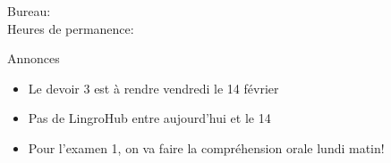 \documentclass{beamer}
\subtitle[Articles et quantités]{Les articles (suite) et les adverbes de quantité}
\begin{document}
  \begin{frame}
    \titlepage
    \tiny{Bureau: \\
          Heures de permanence: }
  \end{frame}

  \begin{frame}{Annonces}
    \begin{itemize}
      \item Le devoir 3 est à rendre vendredi le 14 février
      \item Pas de LingroHub entre aujourd'hui et le 14
      \item Pour l'examen 1, on va faire la compréhension orale lundi matin!
    \end{itemize}
  \end{frame}

\end{document}
